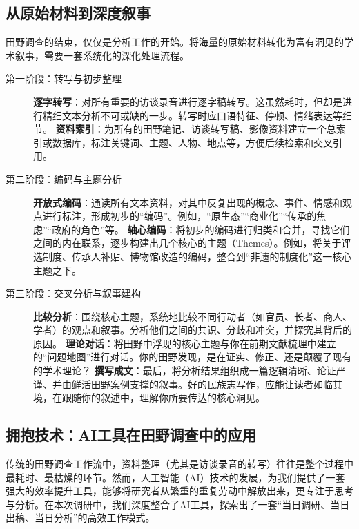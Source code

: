 \documentclass[UTF8]{ctexart}
\begin{document}
\subsection{从原始材料到深度叙事}
田野调查的结束，仅仅是分析工作的开始。将海量的原始材料转化为富有洞见的学术叙事，需要一套系统化的深化处理流程。
\begin{description}
    \item[第一阶段：转写与初步整理]
    \textbf{逐字转写}：对所有重要的访谈录音进行逐字稿转写。这虽然耗时，但却是进行精细文本分析不可或缺的一步。转写时应口语特征、停顿、情绪表达等细节。
    \textbf{资料索引}：为所有的田野笔记、访谈转写稿、影像资料建立一个总索引或数据库，标注关键词、主题、人物、地点等，方便后续检索和交叉引用。
    \item[第二阶段：编码与主题分析]
    \textbf{开放式编码}：通读所有文本资料，对其中反复出现的概念、事件、情感和观点进行标注，形成初步的“编码”。例如，“原生态”“商业化”“传承的焦虑”“政府的角色”等。
    \textbf{轴心编码}：将初步的编码进行归类和合并，寻找它们之间的内在联系，逐步构建出几个核心的主题（Themes）。例如，将关于评选制度、传承人补贴、博物馆改造的编码，整合到“非遗的制度化”这一核心主题之下。
    \item[第三阶段：交叉分析与叙事建构]
    \textbf{比较分析}：围绕核心主题，系统地比较不同行动者（如官员、长者、商人、学者）的观点和叙事。分析他们之间的共识、分歧和冲突，并探究其背后的原因。
    \textbf{理论对话}：将田野中浮现的核心主题与你在前期文献梳理中建立的“问题地图”进行对话。你的田野发现，是在证实、修正、还是颠覆了现有的学术理论？
    \textbf{撰写成文}：最后，将分析结果组织成一篇逻辑清晰、论证严谨、并由鲜活田野案例支撑的叙事。好的民族志写作，应能让读者如临其境，在跟随你的叙述中，理解你所要传达的核心洞见。
\end{description}

\subsection{拥抱技术：AI工具在田野调查中的应用}
传统的田野调查工作流中，资料整理（尤其是访谈录音的转写）往往是整个过程中最耗时、最枯燥的环节。然而，人工智能（AI）技术的发展，为我们提供了一套强大的效率提升工具，能够将研究者从繁重的重复劳动中解放出来，更专注于思考与分析。在本次调研中，我们深度整合了AI工具，探索出了一套“当日调研、当日出稿、当日分析”的高效工作模式。
\end{document}
